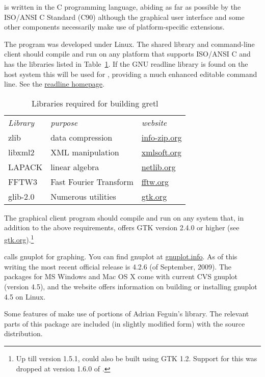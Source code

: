  is written in the C programming language, abiding as far
as possible by the ISO/ANSI C Standard (C90) although the graphical
user interface and some other components necessarily make use of
platform-specific extensions.
  
The program was developed under Linux. The shared library and
command-line client should compile and run on any platform that
supports ISO/ANSI C and has the libraries listed in
Table~\ref{tab:depend}.  If the GNU readline library is found on the
host system this will be used for , providing a much
enhanced editable command line.  See the
\href{http://cnswww.cns.cwru.edu/~chet/readline/rltop.html}{readline
  homepage}.

\begin{table}[htbp]
  \centering
  \begin{tabular}{lll}
\textit{Library} & \textit{purpose} & \textit{website} \\ [4pt]
zlib & data compression &  
   \href{http://www.info-zip.org/pub/infozip/zlib/}{info-zip.org} \\
libxml2 & XML manipulation &
   \href{http://xmlsoft.org/}{xmlsoft.org} \\
LAPACK & linear algebra & 
   \href{http://www.netlib.org/lapack/}{netlib.org} \\
FFTW3 & Fast Fourier Transform & 
   \href{http://www.fftw.org/}{fftw.org} \\
glib-2.0 & Numerous utilities & 
  \href{http://www.gtk.org/}{gtk.org}
  \end{tabular}
  \caption{Libraries required for building gretl}
  \label{tab:depend}
\end{table}

The graphical client program should compile and run on any system
that, in addition to the above requirements, offers GTK version 2.4.0
or higher (see \href{http://www.gtk.org/}{gtk.org}).\footnote{Up till
  version 1.5.1,  could also be built using GTK 1.2.
  Support for this was dropped at version 1.6.0 of .}
  
 calls gnuplot for graphing. You can find gnuplot at
\href{http://www.gnuplot.info/}{gnuplot.info}.  As of this writing the
most recent official release is 4.2.6 (of September, 2009).  The 
 packages for MS Windows and Mac OS X come with 
current CVS gnuplot (version 4.5), and the  website
offers information on building or installing gnuplot 4.5 on
Linux.
  
Some features of  make use of portions of Adrian Feguin's
 library.  The relevant parts of this package are
included (in slightly modified form) with the  source
distribution.
  

